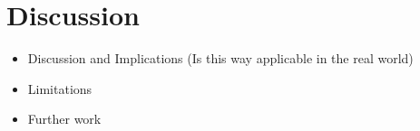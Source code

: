 \chapter{Discussion \label{Chapter-Discussion}}

\begin{itemize}
    \item Discussion and Implications (Is this way applicable in the real world)
    \item Limitations
    \item Further work
\end{itemize}